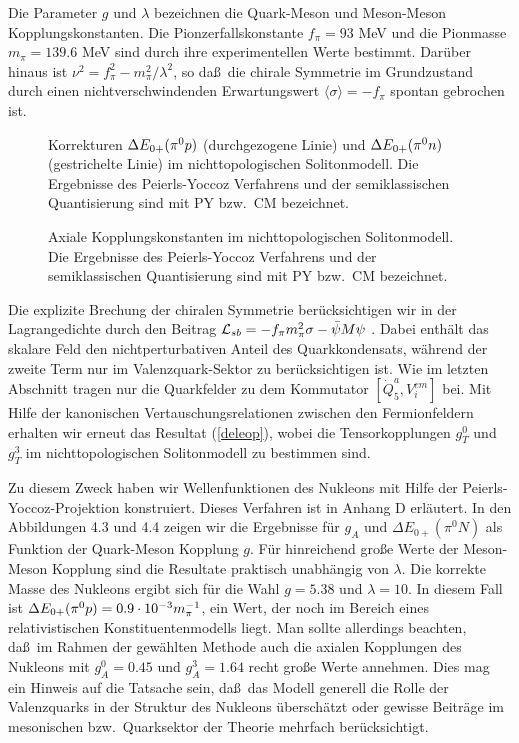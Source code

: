 Die Parameter $g$ und $\lambda$ bezeichnen die Quark-Meson und
Meson-Meson Kopplungskonstanten. Die Pionzerfallskonstante 
$f_\pi=93$ MeV und die Pionmasse $m_\pi=139.6$ MeV sind durch
ihre experimentellen Werte bestimmt. Dar\"uber hinaus ist
$\nu^2=f_\pi^2 -m_\pi^2/\lambda^2$, so da\ss\ die chirale 
Symmetrie im Grundzustand durch einen nichtverschwindenden 
Erwartungswert $\langle\sigma\rangle=-f_\pi$ spontan gebrochen ist. 
\begin{figure}
\caption{Korrekturen $\Delta E_{0+}(\pi^0 p)$ (durchgezogene Linie) und $\Delta E_{0+}(\pi^0 n)$
(gestrichelte Linie) im nichttopologischen Solitonmodell.
Die Ergebnisse des Peierls-Yoccoz Verfahrens und der 
semiklassischen Quantisierung sind mit PY bzw.~CM bezeichnet.}
\vspace{9cm}
\end{figure}
\begin{figure}
\caption{Axiale Kopplungskonstanten im nichttopologischen
Solitonmodell. Die Ergebnisse des Peierls-Yoccoz Verfahrens und der 
semiklassischen Quantisierung sind mit PY bzw.~CM bezeichnet.}
\vspace{9cm}
\end{figure}

Die explizite Brechung der chiralen Symmetrie ber\"ucksichtigen 
wir in der Lagrangedichte durch den Beitrag ${\cal L}_{sb} = 
-f_\pi m_\pi^2\sigma -\bar\psi M\psi$ \cite{JJP89}. Dabei enth\"alt das 
skalare Feld den nichtperturbativen  Anteil des Quarkkondensats,
w\"ahrend der zweite Term nur im Valenzquark-Sektor zu 
ber\"ucksichtigen ist. Wie im letzten Abschnitt tragen nur
die Quarkfelder zu dem Kommutator $[\dot Q_5^a,V_i^{em}]$ bei. 
Mit Hilfe der kanonischen Vertauschungsrelationen zwischen den
Fermionfeldern erhalten wir erneut das Resultat (\ref{deleop}),
wobei die Tensorkopplungen $g_T^0$ und $g_T^3$ im nichttopologischen
Solitonmodell zu bestimmen sind.


Zu diesem Zweck haben wir Wellenfunktionen des Nukleons mit Hilfe
der Peierls-Yoccoz-Projektion konstruiert. Dieses Verfahren ist
in Anhang D erl\"autert. In den Abbildungen 4.3 und 4.4 zeigen wir 
die Ergebnisse f\"ur $g_A$ und $\Delta E_{0+}(\pi^0N)$ als Funktion der 
Quark-Meson Kopplung $g$. F\"ur hinreichend gro\ss e Werte der Meson-Meson 
Kopplung sind die Resultate praktisch unabh\"angig von $\lambda$. 
Die korrekte Masse des Nukleons ergibt sich f\"ur die Wahl
$g=5.38$ und $\lambda =10$.  In diesem Fall ist $\Delta E_{0+}(\pi^0 p)=0.9\cdot 10^{-3} m_\pi^{-1}$,
ein Wert, der noch im Bereich eines relativistischen Konstituentenmodells
liegt. Man sollte allerdings beachten, da\ss\ im Rahmen der 
gew\"ahlten Methode auch die axialen Kopplungen des Nukleons
mit $g_A^0=0.45$ und $g_A^3=1.64$ recht gro\ss e Werte annehmen.
Dies mag ein Hinweis auf die Tatsache sein, da\ss\ das Modell 
generell die Rolle der Valenzquarks in der Struktur des Nukleons
\"ubersch\"atzt oder gewisse Beitr\"age im mesonischen bzw.~Quarksektor
der Theorie mehrfach ber\"ucksichtigt.


